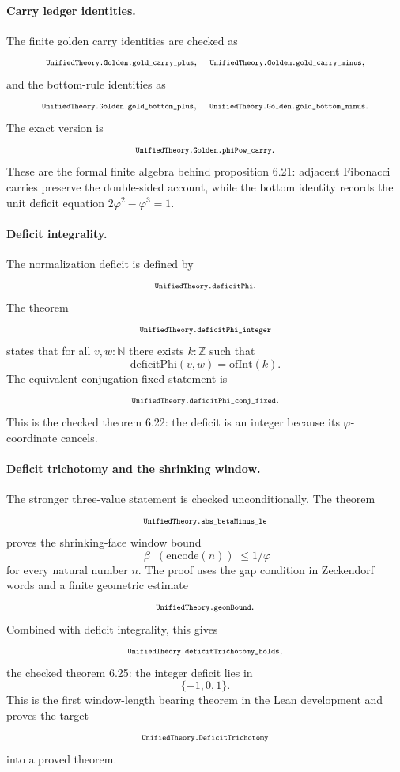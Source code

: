 \documentclass[11pt]{article}
\newcommand{\lean}[1]{\relax\ifmmode\hbox{\scriptsize\ttfamily\detokenize{#1}}\else{\small\texttt{\detokenize{#1}}}\fi}
\newcommand{\Z}{\mathbb{Z}}
\newcommand{\N}{\mathbb{N}}
\newcommand{\phiG}{\varphi}
\begin{document}
\paragraph{Carry ledger identities.}
The finite golden carry identities are checked as
$$
  \lean{UnifiedTheory.Golden.gold_carry_plus},\quad
  \lean{UnifiedTheory.Golden.gold_carry_minus},
$$
and the bottom-rule identities as
$$
  \lean{UnifiedTheory.Golden.gold_bottom_plus},\quad
  \lean{UnifiedTheory.Golden.gold_bottom_minus}.
$$
The exact \lean{PhiInt} version is
$$
  \lean{UnifiedTheory.Golden.phiPow_carry}.
$$
These are the formal finite algebra behind proposition 6.21: adjacent Fibonacci carries preserve the double-sided account, while the bottom identity records the unit deficit equation $2\phiG^2-\phiG^3=1$.

\paragraph{Deficit integrality.}
The normalization deficit is defined by
$$
  \lean{UnifiedTheory.deficitPhi}.
$$
The theorem
$$
  \lean{UnifiedTheory.deficitPhi_integer}
$$
states that for all $v,w:\N$ there exists $k:\Z$ such that
$$
  \mathrm{deficitPhi}(v,w)=\mathrm{ofInt}(k).
$$
The equivalent conjugation-fixed statement is
$$
  \lean{UnifiedTheory.deficitPhi_conj_fixed}.
$$
This is the checked theorem 6.22: the deficit is an integer because its $\phiG$-coordinate cancels.

\paragraph{Deficit trichotomy and the shrinking window.}
The stronger three-value statement is checked unconditionally.  The theorem
$$
  \lean{UnifiedTheory.abs_betaMinus_le}
$$
proves the shrinking-face window bound
$$
  |\beta_-(\mathrm{encode}(n))|\le 1/\phiG
$$
for every natural number $n$.  The proof uses the gap condition in Zeckendorf words and a finite geometric estimate
$$
  \lean{UnifiedTheory.geomBound}.
$$
Combined with deficit integrality, this gives
$$
  \lean{UnifiedTheory.deficitTrichotomy_holds},
$$
the checked theorem 6.25: the integer deficit lies in
$$
  \{-1,0,1\}.
$$
This is the first window-length bearing theorem in the Lean development and proves the target
$$
  \lean{UnifiedTheory.DeficitTrichotomy}
$$
into a proved theorem.
\end{document}
